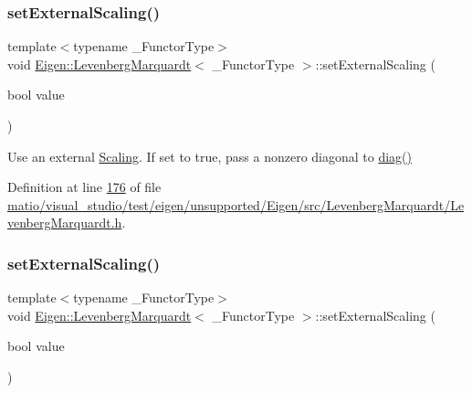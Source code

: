 \subsubsection{\texorpdfstring{set\+External\+Scaling()}{setExternalScaling()}\hspace{0.1cm}{\footnotesize\ttfamily [1/2]}}
{\footnotesize\ttfamily template$<$typename \+\_\+\+Functor\+Type$>$ \\
void \hyperlink{class_eigen_1_1_levenberg_marquardt}{Eigen\+::\+Levenberg\+Marquardt}$<$ \+\_\+\+Functor\+Type $>$\+::set\+External\+Scaling (\begin{DoxyParamCaption}\item[{bool}]{value }\end{DoxyParamCaption})\hspace{0.3cm}{\ttfamily [inline]}}

Use an external \hyperlink{class_scaling}{Scaling}. If set to true, pass a nonzero diagonal to \hyperlink{class_eigen_1_1_levenberg_marquardt_a6e237ca1f23cdf5caa98fe23c6bcf464}{diag()} 

Definition at line \hyperlink{matio_2visual__studio_2test_2eigen_2unsupported_2_eigen_2src_2_levenberg_marquardt_2_levenberg_marquardt_8h_source_l00176}{176} of file \hyperlink{matio_2visual__studio_2test_2eigen_2unsupported_2_eigen_2src_2_levenberg_marquardt_2_levenberg_marquardt_8h_source}{matio/visual\+\_\+studio/test/eigen/unsupported/\+Eigen/src/\+Levenberg\+Marquardt/\+Levenberg\+Marquardt.\+h}.

\mbox{\label{class_eigen_1_1_levenberg_marquardt_a4af7d41545ec5908485357493839e6f6}} 
\subsubsection{\texorpdfstring{set\+External\+Scaling()}{setExternalScaling()}\hspace{0.1cm}{\footnotesize\ttfamily [2/2]}}
{\footnotesize\ttfamily template$<$typename \+\_\+\+Functor\+Type$>$ \\
void \hyperlink{class_eigen_1_1_levenberg_marquardt}{Eigen\+::\+Levenberg\+Marquardt}$<$ \+\_\+\+Functor\+Type $>$\+::set\+External\+Scaling (\begin{DoxyParamCaption}\item[{bool}]{value }\end{DoxyParamCaption})\hspace{0.3cm}{\ttfamily [inline]}}

